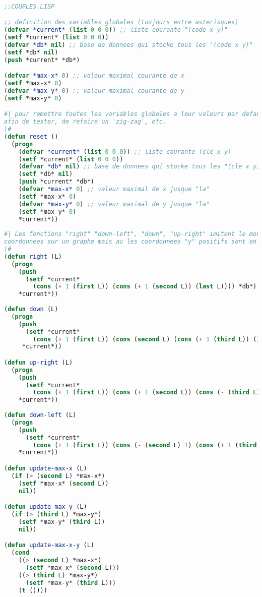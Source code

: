 \documentclass{article}
\begin{document}
\begin{lstlisting}[language=Lisp]

;;COUPLES.LISP

;; definition des variables globales (toujours entre asterisques)
(defvar *current* (list 0 0 0)) ;; liste courante "(code x y)"
(setf *current* (list 0 0 0)) 
(defvar *db* nil) ;; base de donnees qui stocke tous les "(code x y)"
(setf *db* nil)
(push *current* *db*)

(defvar *max-x* 0) ;; valeur maximal courante de x
(setf *max-x* 0)
(defvar *max-y* 0) ;; valeur maximal courante de y
(setf *max-y* 0)

#| pour remettre toutes les variables globales a leur valeurs par defaut 
afin de tester, de refaire un 'zig-zag', etc.
|#
(defun reset ()
  (progn
    (defvar *current* (list 0 0 0)) ;; liste courante (cle x y)
    (setf *current* (list 0 0 0))  
    (defvar *db* nil) ;; base de donnees qui stocke tous les "(cle x y)"
    (setf *db* nil)
    (push *current* *db*)
    (defvar *max-x* 0) ;; valeur maximal de x jusque "la"
    (setf *max-x* 0)
    (defvar *max-y* 0) ;; valeur maximal de y jusque "la"
    (setf *max-y* 0)
    *current*))
  
#| Les fonctions "right" "down-left", "down", "up-right" imitent le movement des 
coordonnees sur un graphe mais au les coordonnees "y" positifs sont en DESSOUS du graphe
|#
(defun right (L)
  (progn
    (push
      (setf *current*
        (cons (+ 1 (first L)) (cons (+ 1 (second L)) (last L)))) *db*)
    *current*))
  
(defun down (L)
  (progn
    (push
      (setf *current*
        (cons (+ 1 (first L)) (cons (second L) (cons (+ 1 (third L)) ())))) *db*)
     *current*))

(defun up-right (L)
  (progn
    (push
      (setf *current*
        (cons (+ 1 (first L)) (cons (+ 1 (second L)) (cons (- (third L) 1) ())))) *db*)
    *current*))
    
(defun down-left (L)
  (progn
	(push
	  (setf *current*
	    (cons (+ 1 (first L)) (cons (- (second L) 1) (cons (+ 1 (third L)) ())))) *db*)
    *current*))

(defun update-max-x (L)
  (if (> (second L) *max-x*)
    (setf *max-x* (second L))
    nil))

(defun update-max-y (L)
  (if (> (third L) *max-y*)
    (setf *max-y* (third L))
    nil))

(defun update-max-x-y (L)
  (cond
    ((> (second L) *max-x*)
      (setf *max-x* (second L)))
    ((> (third L) *max-y*)
      (setf *max-y* (third L)))
    (t ())))


\end{lstlisting}
\end{document}
